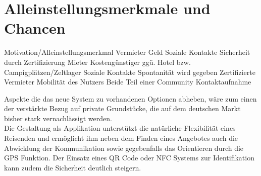 

\section{Alleinstellungsmerkmale und Chancen}
Motivation/Alleinstellungsmerkmal
      Vermieter
      Geld
      Soziale Kontakte
      Sicherheit durch Zertifizierung
      Mieter
      Kostengünstiger ggü. Hotel bzw. Campigplätzen/Zeltlager
      Soziale Kontakte
      Spontanität wird gegeben
      Zertifizierte Vermieter
      Mobilität des Nutzers
      Beide
      Teil einer Community
      Kontaktaufnahme
       
 
Aspekte die das neue System zu vorhandenen Optionen abheben, wäre zum einen der verstärkte Bezug auf private Grundstücke, die auf dem deutschen Markt bisher stark vernachlässigt werden.\\
Die Gestaltung als Applikation unterstützt die natürliche Flexibilität eines Reisenden und ermöglicht ihm neben dem Finden eines Angebotes auch die Abwicklung der Kommunikation sowie gegebenfalls das Orientieren durch die GPS Funktion. Der Einsatz eines QR Code oder NFC Systems zur Identifikation kann zudem die Sicherheit deutlich steigern.